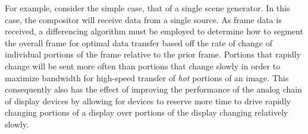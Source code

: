 For example, consider the simple case, that of a single scene generator. In this case, the compositor will receive data from a single source. As frame data is received, a differencing algorithm must be employed to determine how to segment the overall frame for optimal data transfer based off the rate of change of individual portions of the frame relative to the prior frame. Portions that rapidly change will be sent more often than portions that change slowly in order to maximize bandwidth for high-speed transfer of {\it hot} portions of an image. This consequently also has the effect of improving the performance of the analog chain of display devices by allowing for devices to reserve more time to drive rapidly changing portions of a display over portions of the display changing relatively slowly.
